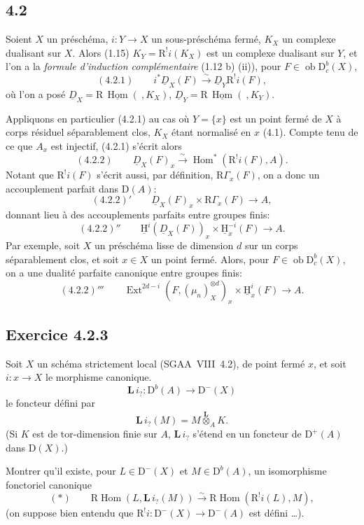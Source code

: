 \documentclass[11pt]{article}
\providecommand{\uH}{\underline{\mathrm H}}
\DeclareMathOperator{\Hom}{Hom}
\DeclareMathOperator{\Ext}{Ext}
\newcommand{\R}{\mathrm{R}}
\newcommand{\D}{\mathrm{D}}
\newcommand{\ob}{\operatorname{ob}}
\providecommand{\Hom}{\operatorname{Hom}}
\providecommand{\ob}{\operatorname{ob}}
\providecommand{\R}{\mathrm R}
\providecommand{\Hom}{\operatorname{Hom}}
\begin{document}
\subsection*{4.2}
Soient $X$ un préschéma, $i:Y\to X$ un sous-préschéma fermé, $K_X$ un complexe dualisant sur $X$. Alors (1.15) $K_Y=\R^{!}i(K_X)$ est un complexe dualisant sur $Y$, et l'on a la \emph{formule d'induction complémentaire} (1.12 b) (ii)), pour $F\in \ob\D_c^b(X)$,
\[
(4.2.1)\qquad i^*\underline{D}_X(F)\xrightarrow{\sim}\underline{D}_Y\R^{!}i(F),
\]
où l'on a posé $\underline{D}_X=\R\,\underline{\Hom}(\ ,K_X)$, $\underline{D}_Y=\R\,\underline{\Hom}(\ ,K_Y)$.

Appliquons en particulier (4.2.1) au cas où $Y=\{x\}$ est un point fermé de $X$ à corps résiduel séparablement clos, $K_X$ étant normalisé en $x$ (4.1). Compte tenu de ce que $A_x$ est injectif, (4.2.1) s'écrit alors
\[
(4.2.2)\qquad \underline{D}_X(F)_x\xrightarrow{\sim}\Hom^*(\R^{!}i(F),A).
\]
Notant que $\R^{!}i(F)$ s'écrit aussi, par définition, $\R\Gamma_x(F)$, on a donc un accouplement parfait dans $\D(A)$:
\[
(4.2.2)'\qquad \underline{D}_X(F)_x\times \R\Gamma_x(F)\longrightarrow A,
\]
donnant lieu à des accouplements parfaits entre groupes finis:
\[
(4.2.2)''\qquad \uH^i(\underline{D}_X(F))_x\times \uH_x^{-i}(F)\longrightarrow A.
\]
Par exemple, soit $X$ un préschéma lisse de dimension $d$ sur un corps séparablement clos, et soit $x\in X$ un point fermé. Alors, pour $F\in\ob\D_c^b(X)$, on a une dualité parfaite canonique entre groupes finis:
\[
(4.2.2)'''\qquad \Ext^{2d-i}(F,(\mu_n)_X^{\otimes d})_x\times \uH_x^i(F)\longrightarrow A.
\]

\subsection*{Exercice 4.2.3}
Soit $X$ un schéma strictement local (SGAA~VIII~4.2), de point fermé $x$, et soit $i:x\to X$ le morphisme canonique.%
\[
\mathbf L\, i_? : \D^b(A)\longrightarrow \D^-(X)
\]
le foncteur défini par
\[
\mathbf L\, i_?(M)=M\overset{\mathbf L}{\otimes}_A K.
\]
(Si $K$ est de tor-dimension finie sur $A$, $\mathbf L\, i_?$ s'étend en un foncteur de $\D^+(A)$ dans $\D(X)$.)

Montrer qu'il existe, pour $L\in\D^-(X)$ et $M\in\D^b(A)$, un isomorphisme fonctoriel canonique
\[
(*)\qquad \R\Hom(L,\mathbf L\, i_?(M))\xrightarrow{\sim}\R\Hom(\R^{!}i(L),M),
\]
(on suppose bien entendu que $\R^{!}i:\D^-(X)\to\D^-(A)$ est défini \dots).
\end{document}
